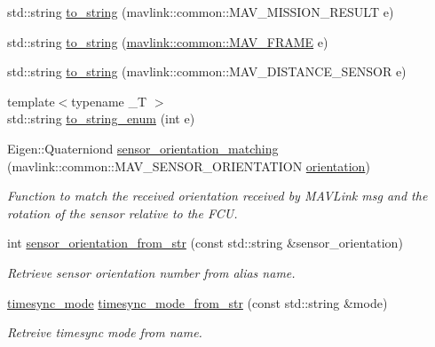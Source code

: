 \begin{DoxyCompactItemize}
\item 
std\+::string \mbox{\hyperlink{group__mavutils_gaa3707eb566a03171dd282eeb7d3ca512}{to\+\_\+string}} (mavlink\+::common\+::\+M\+A\+V\+\_\+\+M\+I\+S\+S\+I\+O\+N\+\_\+\+R\+E\+S\+U\+LT e)
\item 
std\+::string \mbox{\hyperlink{group__mavutils_gaa89b7f807c7cf4be1a8d04377d8ad3bc}{to\+\_\+string}} (\mbox{\hyperlink{include__v0_89_2mavlink__types_8h_aae9266d97d838a375605b69000c60617}{mavlink\+::common\+::\+M\+A\+V\+\_\+\+F\+R\+A\+ME}} e)
\item 
std\+::string \mbox{\hyperlink{group__mavutils_ga5edcd4c7df23cca0ea720877f0fe4142}{to\+\_\+string}} (mavlink\+::common\+::\+M\+A\+V\+\_\+\+D\+I\+S\+T\+A\+N\+C\+E\+\_\+\+S\+E\+N\+S\+OR e)
\item 
{\footnotesize template$<$typename \+\_\+T $>$ }\\std\+::string \mbox{\hyperlink{group__mavutils_ga80987ce0a2019df54e1fe62b7b53de7f}{to\+\_\+string\+\_\+enum}} (int e)
\item 
Eigen\+::\+Quaterniond \mbox{\hyperlink{group__mavutils_ga9f21cd4e0233c34591600f8809c4fb2b}{sensor\+\_\+orientation\+\_\+matching}} (mavlink\+::common\+::\+M\+A\+V\+\_\+\+S\+E\+N\+S\+O\+R\+\_\+\+O\+R\+I\+E\+N\+T\+A\+T\+I\+ON \mbox{\hyperlink{structorientation}{orientation}})
\begin{DoxyCompactList}\small\item\em Function to match the received orientation received by M\+A\+V\+Link msg and the rotation of the sensor relative to the F\+CU. \end{DoxyCompactList}\item 
int \mbox{\hyperlink{group__mavutils_ga0dc70c024ad33cd50af1c9e9bcfaa0c1}{sensor\+\_\+orientation\+\_\+from\+\_\+str}} (const std\+::string \&sensor\+\_\+orientation)
\begin{DoxyCompactList}\small\item\em Retrieve sensor orientation number from alias name. \end{DoxyCompactList}\item 
\mbox{\hyperlink{group__mavutils_gac7f53712a7627f397d0eb145c2a16cf7}{timesync\+\_\+mode}} \mbox{\hyperlink{group__mavutils_gaacb385ef1414eb5c38c20f4f4d91d321}{timesync\+\_\+mode\+\_\+from\+\_\+str}} (const std\+::string \&mode)
\begin{DoxyCompactList}\small\item\em Retreive timesync mode from name. \end{DoxyCompactList}\item 

\end{DoxyCompactItemize}
